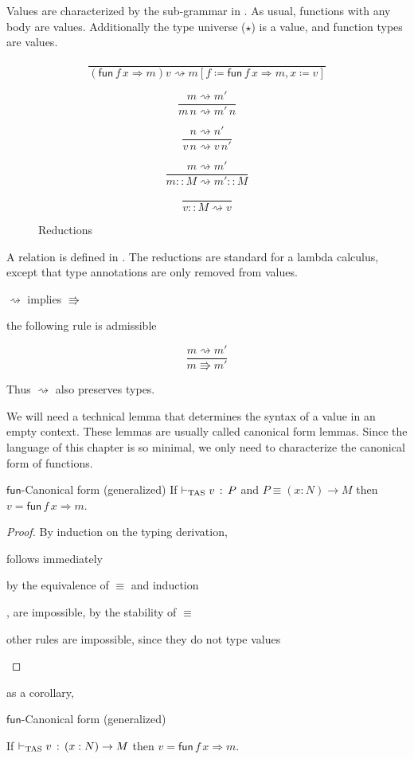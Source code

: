 Values are characterized by the sub-grammar in .
As usual, functions with any body are values.
Additionally the type universe ($\star$) is a value, and function types are values.
 
\begin{figure}
\[
\frac{\,}{\left(\mathsf{fun}\,f\,x\Rightarrow m\right)v\rightsquigarrow m\left[f\coloneqq\mathsf{fun}\,f\,x\Rightarrow m,x\coloneqq v\right]}
\]
 
\[
\frac{m\rightsquigarrow m'}{m\,n\rightsquigarrow m'\,n}
\]
 
\[
\frac{n\rightsquigarrow n'}{v\,n\rightsquigarrow v\,n'}
\]
 
\[
\frac{m\rightsquigarrow m'}{m::M\rightsquigarrow m'::M}
\]
 
\[
\frac{\,}{v::M\rightsquigarrow v}
\]
 
\caption{\SLang{} \CbV{} Reductions}
\label{fig:surface-reduction-step}
\end{figure}
 
A \cbv{} relation is defined in .
The reductions are standard for a \cbv{} lambda calculus, except that type annotations are only removed from values.
 
\begin{fact}
$\rightsquigarrow$ implies $\Rrightarrow$
 
the following rule is admissible
 
\[
\frac{m\rightsquigarrow m'}{m\Rrightarrow m'}
\]
\end{fact}
 
Thus $\rightsquigarrow$ also preserves types.
 
We will need a technical lemma that determines the syntax of a value in an empty context.
These lemmas are usually called canonical form lemmas.
Since the language of this chapter is so minimal, we only need to characterize the canonical form of functions.
 
\begin{lem}
 $\mathsf{fun}$-Canonical form (generalized)
 If $\vdash_{\mathrm{TAS}} v\,:\,P$ and $P\equiv\left(x:N\right)\rightarrow M$ then $v=\mathsf{fun}\,f\,x\Rightarrow m$.
\end{lem}
\begin{proof}
By induction on the typing derivation,
 
\begin{casenv}
\item {} follows immediately
\item {} by the equivalence of $\equiv$ and induction
\item {},  are impossible, by the stability of $\equiv$
\item other rules  are impossible, since they do not type values
\end{casenv}
\end{proof}
as a corollary,
\begin{cor}
$\mathsf{fun}$-Canonical form (generalized)
 
If $\vdash_{\mathrm{TAS}} v\,:\,\left(x:N\right)\rightarrow M$ then \textup{$v=\mathsf{fun}\,f\,x\Rightarrow m$.}
\end{cor}
 
